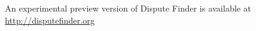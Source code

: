\documentclass{www2010-submission}
\newcommand{\todo}[1]{}
\begin{document}
An experimental preview version of Dispute Finder is available at 
\url{http://disputefinder.org}


\todo{Add count of disputed claims}


\todo{Do we want to have acknowledgements}


\todo{Sort out bad references}

\end{document}
